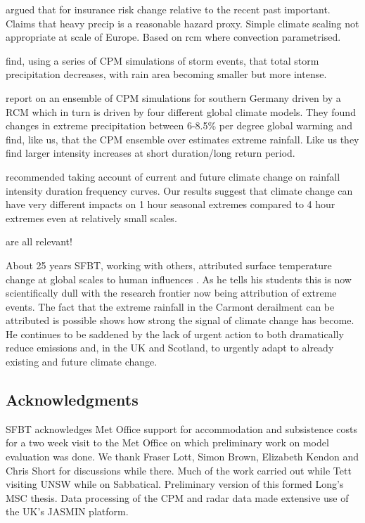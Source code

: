 \documentclass[11pt,a4paper]{article}
\begin{document}
\cite{lang2024catmodels} argued that for insurance risk change relative to the recent past important. Claims that heavy precip is a reasonable hazard proxy. Simple climate scaling not appropriate at scale of Europe. Based on  rcm where convection parametrised.

\cite{Moshe2022extremes} find, using a series of CPM simulations  of storm events, that total storm precipitation decreases, with rain area becoming smaller but more intense. 

\cite{hundhausen2024extreme_precip} report on an ensemble of CPM simulations for southern Germany driven by a RCM which in turn is driven by four different global climate models. They found changes in extreme precipitation between 6-8.5\% per degree global warming and find, like us, that the CPM ensemble over estimates extreme rainfall. Like us they find larger intensity increases at short duration/long return period.  

\cite{martel2021rainfall_ifd} recommended taking account of current and future climate change on rainfall intensity duration frequency curves. Our results suggest that climate change can have very different impacts on 1 hour seasonal extremes compared to 4 hour extremes even at relatively small scales. 

\cite{saltikoff2019radar_climate,kendon2021ukclimate,karoly06cet,harrison2000nimrod,kendon2023uk_climate} are all relevant! 

About 25 years  SFBT, working with others, attributed surface temperature  change at global scales to human influences \parencite{tett99c20tc,stott00sci}. As he tells his students this is now scientifically dull with the research frontier now being attribution of extreme  events. The fact that the extreme rainfall in the Carmont derailment can be attributed is  possible shows how strong the signal of climate change has become.  He continues to be saddened by the lack of urgent action to both dramatically reduce emissions and, in the UK and Scotland, to urgently adapt to already existing and future climate change\parencite{ccc2024no_action}.

\printbibliography %

\subsection*{Acknowledgments}
SFBT acknowledges  Met Office support for accommodation and subsistence costs for a two week visit to the Met Office on which preliminary work on model evaluation was done. We thank Fraser Lott, Simon Brown, Elizabeth Kendon and Chris Short for discussions while there. Much of the  work carried out while Tett visiting UNSW while on Sabbatical. Preliminary version of this formed Long's MSC thesis.  Data processing of the CPM and radar data made extensive use of the UK's JASMIN platform. 
\end{document}
